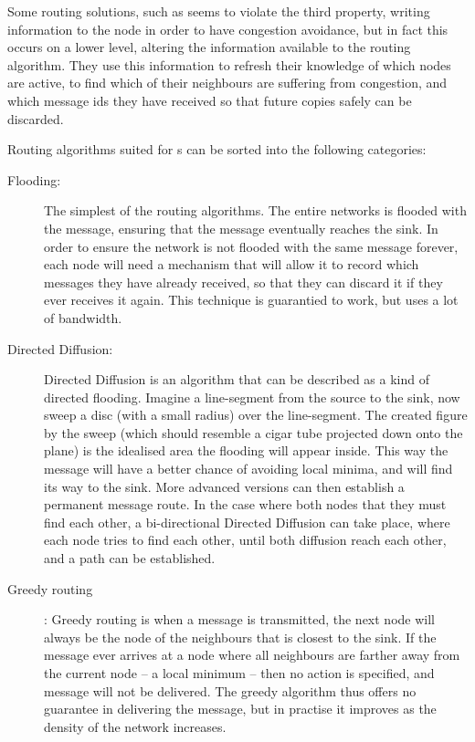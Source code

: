 \documentclass[letter, 12pt, english, draft]{article}
\begin{document}
Some routing solutions, such as \cite{speed} seems to violate the third property, writing information to the node in order to have congestion avoidance, but in fact this occurs on a lower level, altering the information available to the routing algorithm. They use this information to refresh their knowledge of which nodes are active, to find which of their neighbours are suffering from congestion, and which message ids they have received so that future copies safely can be discarded. 

Routing algorithms suited for \manet s can be sorted into the following categories:
\begin{description}
\item[Flooding:] The simplest of the routing algorithms. The entire networks is flooded with the message, ensuring that the message eventually reaches the sink. In order to ensure the network is not flooded with the same message forever, each node will need a mechanism that will allow it to record which messages they have already received, so that they can discard it if they ever receives it again. This technique is guarantied to work, but uses a lot of bandwidth.

\item[Directed Diffusion:] Directed Diffusion is an algorithm that can be described as a kind of directed flooding. Imagine a line-segment from the source to the sink, now sweep a disc (with a small radius) over the line-segment. The created figure by the sweep (which should resemble a cigar tube projected down onto the plane) is the idealised area the flooding will appear inside. This way the message will have a better chance of avoiding local minima, and will find its way to the sink. More advanced versions can then establish a permanent message route. In the case where both nodes that they must find each other, a bi-directional Directed Diffusion can take place, where each node tries to find each other, until both diffusion reach each other, and a path can be established.

\item[Greedy routing]: Greedy routing is when a message is transmitted, the next node will always be the node of the neighbours that is closest to the sink. If the message ever arrives at a node where all neighbours are farther away from the current node -- a local minimum -- then no action is specified, and message will not be delivered. The greedy algorithm thus offers no guarantee in delivering the message, but in practise it improves as the density of the network increases.


\end{description}
\end{document}
